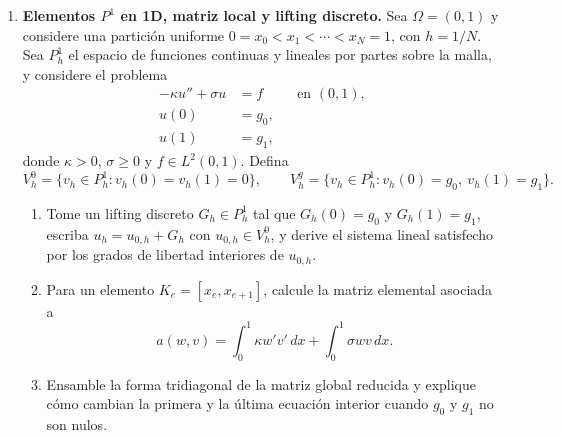\documentclass[11pt]{article}
\theoremstyle{thmstyle}
\begin{document}
\begin{enumerate}[label=\textbf{\arabic*.}, leftmargin=*]

    \item \textbf{Elementos $P^1$ en 1D, matriz local y lifting discreto.} Sea $\Omega=(0,1)$ y considere una partici\'on uniforme $0=x_0<x_1<\cdots<x_N=1$, con $h=1/N$. Sea $P^1_h$ el espacio de funciones continuas y lineales por partes sobre la malla, y considere el problema
    \[
    \begin{aligned}
        -\kappa u''+\sigma u &= f &&\text{en }(0,1),\\
        u(0)&=g_0,\\
        u(1)&=g_1,
    \end{aligned}
    \]
    donde $\kappa>0$, $\sigma\ge 0$ y $f\in L^2(0,1)$. Defina
    \[
        V_h^0=\{v_h\in P^1_h:v_h(0)=v_h(1)=0\},
        \qquad
        V_h^g=\{v_h\in P^1_h:v_h(0)=g_0,\ v_h(1)=g_1\}.
    \]
    \begin{enumerate}[label=(\alph*)]
        \item Tome un lifting discreto $G_h\in P^1_h$ tal que $G_h(0)=g_0$ y $G_h(1)=g_1$, escriba $u_h=u_{0,h}+G_h$ con $u_{0,h}\in V_h^0$, y derive el sistema lineal satisfecho por los grados de libertad interiores de $u_{0,h}$.
        \item Para un elemento $K_e=[x_e,x_{e+1}]$, calcule la matriz elemental asociada a
        \[
            a(w,v)=\int_0^1 \kappa w'v'\,dx+\int_0^1 \sigma wv\,dx.
        \]
        \item Ensamble la forma tridiagonal de la matriz global reducida y explique c\'omo cambian la primera y la \'ultima ecuaci\'on interior cuando $g_0$ y $g_1$ no son nulos.
    \end{enumerate}


\end{enumerate}
\end{document}
